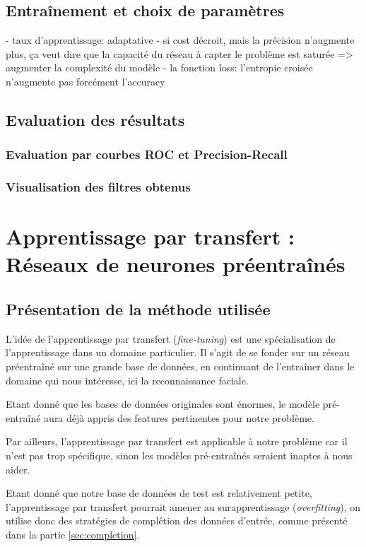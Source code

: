 \documentclass[a4paper,11pt]{article}
\begin{document}
    

\subsection{Entraînement et choix de paramètres}
- taux d'apprentissage: adaptative
- si cost décroit, mais la précision n'augmente plus, ça veut dire que la capacité du réseau à capter le problème est saturée => augmenter la complexité du modèle
- la fonction loss: l'entropie croisée n'augmente pas forcément l'accuracy
\subsection{Evaluation des résultats}
\subsubsection{Evaluation par courbes ROC et Precision-Recall}
\subsubsection{Visualisation des filtres obtenus}

\section{Apprentissage par transfert : Réseaux de neurones préentraînés}
\subsection{Présentation de la méthode utilisée}

L'idée de l'apprentissage par transfert (\textit{fine-tuning}) est une spécialisation de l'apprentissage dans un domaine particulier. Il s'agit de se fonder sur un réseau préentraîné sur une grande base de données, en continuant de l'entraîner dans le domaine qui nous intéresse, ici la reconnaissance faciale.

Etant donné que les bases de données originales sont énormes, le modèle pré-entraîné aura déjà appris des features pertinentes pour notre problème.

Par ailleurs, l'apprentissage par transfert est applicable à notre problème car il n'est pas trop spécifique, sinon les modèles pré-entraînés seraient inaptes à nous aider.

Etant donné que notre base de données de test est relativement petite, l'apprentissage par transfert pourrait amener au surapprentissage (\textit{overfitting}), on utilise donc des stratégies de complétion des données d'entrée, comme présenté dans la partie \ref{sec:completion}.
\end{document}
